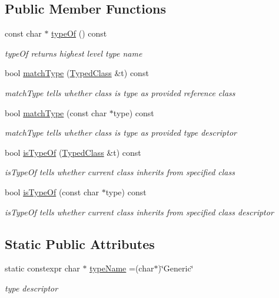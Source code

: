 \subsection*{Public Member Functions}
\begin{DoxyCompactItemize}
\item 
const char $\ast$ \hyperlink{classTypedClass_ad12ee69d293a535940caea9cceea2659}{type\+Of} () const 
\begin{DoxyCompactList}\small\item\em type\+Of returns highest level type name \end{DoxyCompactList}\item 
bool \hyperlink{classTypedClass_a4af819bf3ec6b84e65c97fff993a1392}{match\+Type} (\hyperlink{classTypedClass}{Typed\+Class} \&t) const 
\begin{DoxyCompactList}\small\item\em match\+Type tells whether class is type as provided reference class \end{DoxyCompactList}\item 
bool \hyperlink{classTypedClass_ad31239a6b7d8eab7a63a8c28767e99e9}{match\+Type} (const char $\ast$type) const 
\begin{DoxyCompactList}\small\item\em match\+Type tells whether class is type as provided type descriptor \end{DoxyCompactList}\item 
bool \hyperlink{classTypedClass_a3b2358800578595aa3d490917431e19a}{is\+Type\+Of} (\hyperlink{classTypedClass}{Typed\+Class} \&t) const 
\begin{DoxyCompactList}\small\item\em is\+Type\+Of tells whether current class inherits from specified class \end{DoxyCompactList}\item 
bool \hyperlink{classTypedClass_ab4fc19854ea57d5055cd0d0e1baeec11}{is\+Type\+Of} (const char $\ast$type) const 
\begin{DoxyCompactList}\small\item\em is\+Type\+Of tells whether current class inherits from specified class descriptor \end{DoxyCompactList}\end{DoxyCompactItemize}
\subsection*{Static Public Attributes}
\begin{DoxyCompactItemize}
\item 
\hypertarget{classTypedClass_a14ef8946c4d5af21949bde220d686617}{}static constexpr char $\ast$ \hyperlink{classTypedClass_a14ef8946c4d5af21949bde220d686617}{type\+Name} =(char$\ast$)\char`\"{}Generic\char`\"{}\label{classTypedClass_a14ef8946c4d5af21949bde220d686617}

\begin{DoxyCompactList}\small\item\em type descriptor \end{DoxyCompactList}\end{DoxyCompactItemize}
